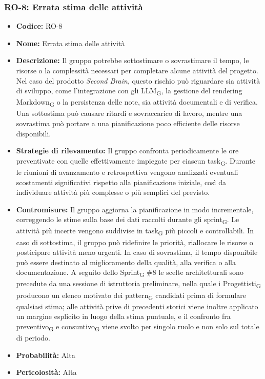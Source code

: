 ﻿\documentclass[a4paper, 10pt, colorlinks=true, linkcolor=black, urlcolor=blue, citecolor=blue, hidelinks]{article}
\begin{document}
\subsubsection{RO-8: Errata stima delle attività}

\begin{itemize}
    \item \textbf{Codice:} RO-8

    \item \textbf{Nome:} Errata stima delle attività

    \item \textbf{Descrizione:} Il gruppo potrebbe sottostimare o sovrastimare il tempo, le risorse o la complessità necessari per completare alcune attività del progetto. Nel caso del prodotto \textit{Second Brain}, questo rischio può riguardare sia attività di sviluppo, come l'integrazione con gli LLM\textsubscript{G}, la gestione del rendering Markdown\textsubscript{G} o la persistenza delle note, sia attività documentali e di verifica. Una sottostima può causare ritardi e sovraccarico di lavoro, mentre una sovrastima può portare a una pianificazione poco efficiente delle risorse disponibili.

    \item \textbf{Strategie di rilevamento:} Il gruppo confronta periodicamente le ore preventivate con quelle effettivamente impiegate per ciascun task\textsubscript{G}. Durante le riunioni di avanzamento e retrospettiva vengono analizzati eventuali scostamenti significativi rispetto alla pianificazione iniziale, così da individuare attività più complesse o più semplici del previsto.

    \item \textbf{Contromisure:} Il gruppo aggiorna la pianificazione in modo incrementale, correggendo le stime sulla base dei dati raccolti durante gli sprint\textsubscript{G}. Le attività più incerte vengono suddivise in task\textsubscript{G} più piccoli e controllabili. In caso di sottostima, il gruppo può ridefinire le priorità, riallocare le risorse o posticipare attività meno urgenti. In caso di sovrastima, il tempo disponibile può essere destinato al miglioramento della qualità, alla verifica o alla documentazione. A seguito dello Sprint\textsubscript{G} \#8 le scelte architetturali sono precedute da una sessione di istruttoria preliminare, nella quale i Progettisti\textsubscript{G} producono un elenco motivato dei pattern\textsubscript{G} candidati prima di formulare qualsiasi stima; alle attività prive di precedenti storici viene inoltre applicato un margine esplicito in luogo della stima puntuale, e il confronto fra preventivo\textsubscript{G} e consuntivo\textsubscript{G} viene svolto per singolo ruolo e non solo sul totale di periodo.

    \item \textbf{Probabilità:} Alta

    \item \textbf{Pericolosità:} Alta
\end{itemize}
\end{document}
